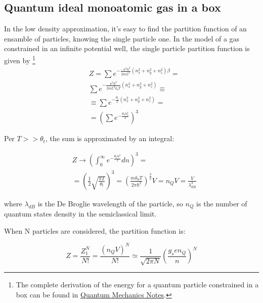 \documentclass{article}
\begin{document}
\subsection{Quantum ideal monoatomic gas in a box}

In the low density approximation, it's easy to find the partition function of an ensamble of particles,
knowing the single particle one.
In the model of a gas constrained in an infinite potential well, the single particle partition function is given by
\footnote{
    The complete derivation of the energy for a quantum particle constrained in a box can be found in
    \href{https://cesaresabattini.github.io/Physics-Lecture-Notes/}{Quantum Mechanics Notes}.
}
\begin{equation}
    \begin{aligned}
         & Z=\sum e^{-\frac{-\pi^2\hbar^2}{2mL^2}(n_x^2+n_y^2+n_z^2)\beta}=  \\
         & \sum e^{-\frac{\pi^2\hbar^2}{2mL^2k_bT}(n_x^2+n_y^2+n_z^2)}\equiv \\
         & \equiv\sum e^{-\frac{\theta_t}{T}(n_x^2+n_y^2+n_z^2)}=            \\
         & =\left(\sum e^{-\frac{\theta_tn_x^3}{T}}\right)^3
    \end{aligned}
\end{equation}

Per $T>>\theta_t$, the sum is approximated by an integral:

\begin{equation}
    \begin{aligned}
         & Z \rightarrow \left(\int_{0}^{\infty} e^{-\frac{\theta_tn^2}{T}}dn\right)^3=                                                                    \\
         & =\left(\frac{1}{2}\sqrt{\frac{\pi T}{\theta_t}}\right)^3= \left(\frac{mk_bT}{2\pi\hbar^2}\right)^{\frac{3}{2}}V= n_QV= \frac{V}{\lambda_{dB}^3}
    \end{aligned}
\end{equation}

where $\lambda_{dB}$ is the De Broglie wavelength of the particle, so $n_Q$ is the number of quantum states density in the semiclassical limit.

When N particles are considered, the partition function is:

\begin{equation}
    Z=\frac{Z_1^N}{N!}=\frac{(n_QV)^N}{N!}\simeq \frac{1}{\sqrt{2\pi N}}\left(\frac{g_sen_Q}{n}\right)^N
\end{equation}
\end{document}
